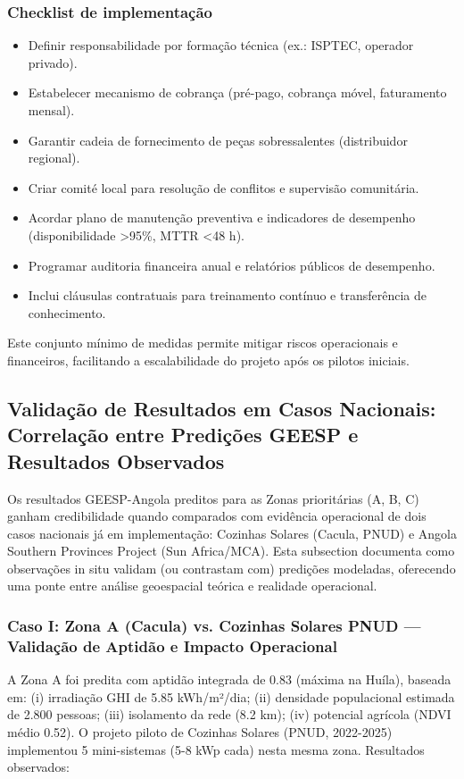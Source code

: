 \documentclass[12pt, a4paper]{article}
\begin{document}
\subsubsection*{Checklist de implementação}
\begin{itemize}
  \item Definir responsabilidade por formação técnica (ex.: ISPTEC, operador privado).
  \item Estabelecer mecanismo de cobrança (pré-pago, cobrança móvel, faturamento mensal).
  \item Garantir cadeia de fornecimento de peças sobressalentes (distribuidor regional).
  \item Criar comité local para resolução de conflitos e supervisão comunitária.
  \item Acordar plano de manutenção preventiva e indicadores de desempenho (disponibilidade >95\%, MTTR <48 h).
  \item Programar auditoria financeira anual e relatórios públicos de desempenho.
  \item Inclui cláusulas contratuais para treinamento contínuo e transferência de conhecimento.
\end{itemize}


\noindent Este conjunto mínimo de medidas permite mitigar riscos operacionais e financeiros,
facilitando a escalabilidade do projeto após os pilotos iniciais.

\subsection{Validação de Resultados em Casos Nacionais: Correlação entre Predições GEESP e Resultados Observados}

Os resultados GEESP-Angola preditos para as Zonas prioritárias (A, B, C) ganham credibilidade quando comparados com evidência operacional de dois casos nacionais já em implementação: Cozinhas Solares (Cacula, PNUD) e Angola Southern Provinces Project (Sun Africa/MCA). Esta subsection documenta como observações in situ validam (ou contrastam com) predições modeladas, oferecendo uma ponte entre análise geoespacial teórica e realidade operacional.

\subsubsection*{Caso I: Zona A (Cacula) vs. Cozinhas Solares PNUD — Validação de Aptidão e Impacto Operacional}

A Zona A foi predita com aptidão integrada de 0.83 (máxima na Huíla), baseada em: (i) irradiação GHI de 5.85 kWh/m²/dia; (ii) densidade populacional estimada de 2.800 pessoas; (iii) isolamento da rede (8.2 km); (iv) potencial agrícola (NDVI médio 0.52). O projeto piloto de Cozinhas Solares (PNUD, 2022-2025) implementou 5 mini-sistemas (5-8 kWp cada) nesta mesma zona. Resultados observados:
\end{document}
